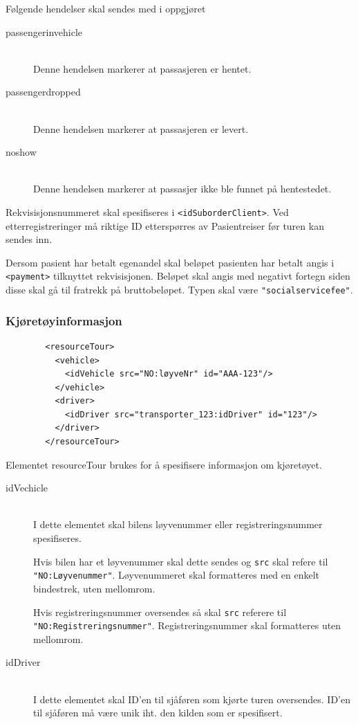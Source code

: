 \documentclass[a4paper,titlepage,norsk,11pt]{article}
\begin{document}
Følgende hendelser skal sendes med i oppgjøret

\begin{description}

	\item[passengerinvehicle] \hfill \\
	Denne hendelsen markerer at passasjeren er hentet.

	\item[passengerdropped] \hfill \\
	Denne hendelsen markerer at passasjeren er levert.

	\item[noshow] \hfill \\
	Denne hendelsen markerer at passasjer ikke ble funnet på hentestedet.

\end{description}

Rekvisisjonsnummeret skal spesifiseres i \lstinline{<idSuborderClient>}. Ved etterregistreringer må riktige ID etterspørres av Pasientreiser før turen kan sendes inn.

Dersom pasient har betalt egenandel skal beløpet pasienten har betalt angis i \lstinline{<payment>} tilknyttet rekvisisjonen. Beløpet skal angis med negativt fortegn siden disse skal gå til fratrekk på bruttobeløpet. Typen skal være \lstinline{"socialservicefee"}.

\subsubsection{Kjøretøyinformasjon}

\begin{lstlisting}
        <resourceTour>
          <vehicle>
            <idVehicle src="NO:løyveNr" id="AAA-123"/>
          </vehicle>
          <driver>
            <idDriver src="transporter_123:idDriver" id="123"/>
          </driver>
        </resourceTour>
\end{lstlisting}

Elementet resourceTour brukes for å spesifisere informasjon om kjøretøyet.

\begin{description}

	\item[idVechicle] \hfill \\
	I dette elementet skal bilens løyvenummer eller registreringsnummer spesifiseres.

	Hvis bilen har et løyvenummer skal dette sendes og \lstinline{src} skal refere til \lstinline{"NO:Løyvenummer"}. Løyvenummeret skal formatteres med en enkelt bindestrek, uten mellomrom.

	Hvis registreringsnummer oversendes så skal \lstinline{src} referere til \lstinline{"NO:Registreringsnummer"}. Registreringsnummer skal formatteres uten mellomrom.

	\item[idDriver] \hfill \\
	I dette elementet skal ID'en til sjåføren som kjørte turen oversendes. ID'en til sjåføren må være unik iht. den kilden som er spesifisert.

\end{description}
\end{document}
